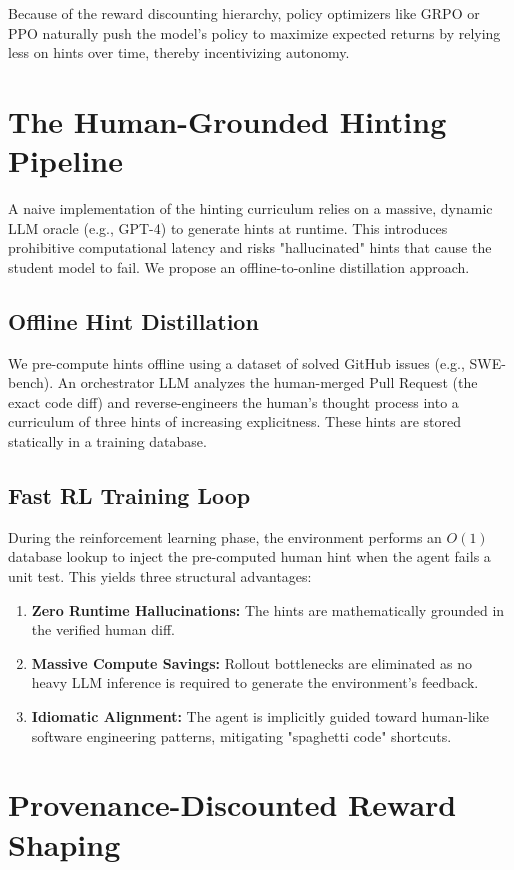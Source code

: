 \documentclass[10pt, letterpaper]{article}
\begin{document}
Because of the reward discounting hierarchy, policy optimizers like GRPO or PPO naturally push the model's policy to maximize expected returns by relying less on hints over time, thereby incentivizing autonomy.

\section{The Human-Grounded Hinting Pipeline}

A naive implementation of the hinting curriculum relies on a massive, dynamic LLM oracle (e.g., GPT-4) to generate hints at runtime. This introduces prohibitive computational latency and risks "hallucinated" hints that cause the student model to fail. We propose an offline-to-online distillation approach.

\subsection{Offline Hint Distillation}
We pre-compute hints offline using a dataset of solved GitHub issues (e.g., SWE-bench). An orchestrator LLM analyzes the human-merged Pull Request (the exact code diff) and reverse-engineers the human's thought process into a curriculum of three hints of increasing explicitness. These hints are stored statically in a training database.

\subsection{Fast RL Training Loop}
During the reinforcement learning phase, the environment performs an $O(1)$ database lookup to inject the pre-computed human hint when the agent fails a unit test. This yields three structural advantages:
\begin{enumerate}
    \item \textbf{Zero Runtime Hallucinations:} The hints are mathematically grounded in the verified human diff.
    \item \textbf{Massive Compute Savings:} Rollout bottlenecks are eliminated as no heavy LLM inference is required to generate the environment's feedback.
    \item \textbf{Idiomatic Alignment:} The agent is implicitly guided toward human-like software engineering patterns, mitigating "spaghetti code" shortcuts.
\end{enumerate}

\section{Provenance-Discounted Reward Shaping}
\end{document}
